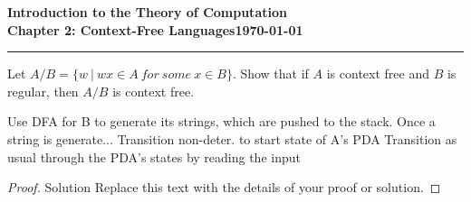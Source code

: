 \documentclass[11pt]{article}
\newcommand{\dated}{\today}
\begin{document}
\textbf{Introduction to the Theory of
Computation}\hfill\textbf{\myname}\\[0.01in]
\textbf{Chapter 2: Context-Free Languages}\hfill\textbf{\dated}\\
\smallskip\hrule\bigskip

\begin{problem}{2.20}
Let $A/B = \{w \ | \ wx \in A \ for \ some \ x \in B\}$. Show that if $A$ is context free and $B$ is regular, then $A/B$ is context free.
\end{problem}

\begin{idea}
Use DFA for B to generate its strings, which are pushed to the stack.
  Once a string is generate...
    Transition non-deter. to start state of A's PDA
    Transition as usual through the PDA's states by reading the input
\end{idea}

\begin{proof}
Solution Replace this text with the details of your proof or solution.
\end{proof}
\end{document}
